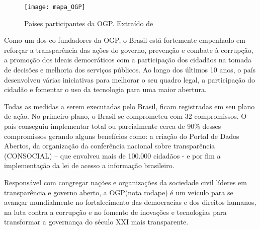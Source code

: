 \graphicspath{{figuras/}}
\begin{figure}[H]
	\centering
	\texttt{[image: mapa\_OGP]}
	\caption{Países participantes da OGP. Extraído de \cite{mapaogp} }
	\label{portal}
\end{figure}

Como um dos co-fundadores da OGP, o Brasil está fortemente empenhado em reforçar a transparência das ações do governo, prevenção e combate à corrupção, a promoção dos ideais democráticos com a participação dos cidadãos na tomada de decisões e melhoria dos serviços públicos. Ao longo dos últimos 10 anos, o país desenvolveu várias iniciativas para melhorar o seu quadro legal, a participação do cidadão e fomentar o uso da tecnologia para uma maior abertura.

Todas as medidas a serem executadas pelo Brasil, ficam registradas em seu plano de ação. No primeiro plano, o Brasil se comprometeu com 32 compromissos. O país conseguiu implementar total ou parcialmente cerca de 90\% desses compromissos gerando alguns benefícios como: a criação do Portal de Dados Abertos, da organização da conferência nacional sobre transparência (CONSOCIAL) – que envolveu mais de 100.000 cidadãos - e por fim a implementação da lei de acesso a informação brasileiro.

Responsável com congregar nações e organizações da sociedade civil líderes em transparência e governo aberto, a OGP(nota rodape) é um veículo para se avançar mundialmente no fortalecimento das democracias e dos direitos humanos, na luta contra a corrupção e no fomento de inovações e tecnologias para transformar a governança do século XXI mais transparente.